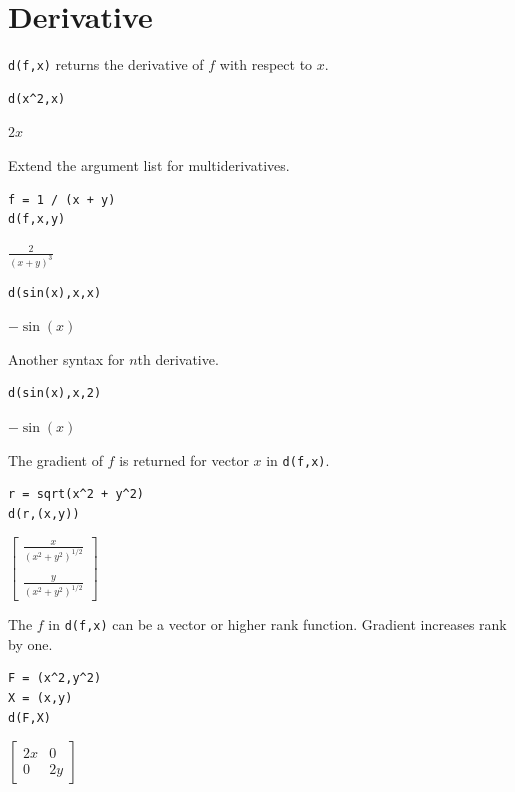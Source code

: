 
\newpage

\section{Derivative}

\verb$d(f,x)$ returns the derivative of $f$ with respect to $x$.

{\color{blue}
\begin{verbatim}
d(x^2,x)
\end{verbatim}}

$2x$

\bigskip
Extend the argument list for multiderivatives.

{\color{blue}
\begin{verbatim}
f = 1 / (x + y)
d(f,x,y)
\end{verbatim}}

$\displaystyle
\frac{2}{(x+y)^3}
$

{\color{blue}
\begin{verbatim}
d(sin(x),x,x)
\end{verbatim}}

$-\sin(x)$

\bigskip
Another syntax for $n$th derivative.

{\color{blue}
\begin{verbatim}
d(sin(x),x,2)
\end{verbatim}}

$-\sin(x)$

\bigskip
The gradient of $f$ is returned for vector $x$ in \verb$d(f,x)$.

{\color{blue}
\begin{verbatim}
r = sqrt(x^2 + y^2)
d(r,(x,y))
\end{verbatim}
}

$\displaystyle
\begin{bmatrix}
{\displaystyle \frac{x}{(x^2+y^2)^{1/2}}}
\\
\\
{\displaystyle \frac{y}{(x^2+y^2)^{1/2}}}
\end{bmatrix}
$

\bigskip
The $f$ in \verb$d(f,x)$ can be a vector or higher rank function.
Gradient increases rank by one.

{\color{blue}
\begin{verbatim}
F = (x^2,y^2)
X = (x,y)
d(F,X)
\end{verbatim}
}

$\displaystyle
\begin{bmatrix}
2x & 0
\\[1ex]
0 & 2y
\end{bmatrix}
$


